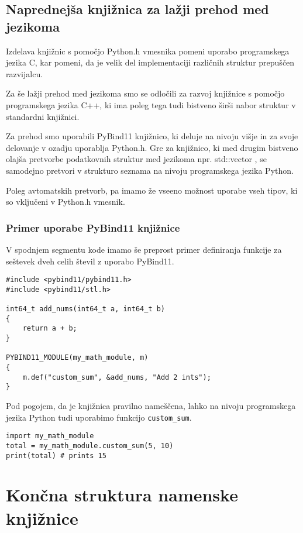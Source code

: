 \documentclass[a4paper,12pt,openright]{book}
\begin{document}
    \subsection{Naprednejša knjižnica za lažji prehod med jezikoma}

    Izdelava knjižnic s pomočjo Python.h vmesnika pomeni uporabo programskega jezika C, kar pomeni, da je velik del implementaciji različnih struktur prepuščen razvijalcu.
    
    Za še lažji prehod med jezikoma smo se odločili za razvoj knjižnice s pomočjo programskega jezika C++, ki ima poleg tega tudi bistveno širši nabor struktur v standardni knjižnici. 

    Za prehod smo uporabili PyBind11 \cite{PYBIND11_GITHUB} knjižnico, ki deluje na nivoju višje in za svoje delovanje v ozadju uporablja Python.h. Gre za knjižnico, ki med drugim bistveno olajša pretvorbe podatkovnih struktur med jezikoma npr. std::vector \cite{CPP_VECTOR}, se samodejno pretvori v strukturo seznama na nivoju programskega jezika Python.

    Poleg avtomatskih pretvorb, pa imamo že vseeno možnost uporabe vseh tipov, ki so vključeni v Python.h vmesnik.

    \subsubsection{Primer uporabe PyBind11 knjižnice}
    V spodnjem segmentu kode imamo še preprost primer definiranja funkcije za seštevek dveh celih števil z uporabo PyBind11.
\begin{verbatim}
#include <pybind11/pybind11.h>
#include <pybind11/stl.h>

int64_t add_nums(int64_t a, int64_t b)
{
    return a + b;
}

PYBIND11_MODULE(my_math_module, m)
{
    m.def("custom_sum", &add_nums, "Add 2 ints");
}
\end{verbatim}

    \noindent
    Pod pogojem, da je knjižnica pravilno nameščena, lahko na nivoju programskega jezika Python tudi uporabimo funkcijo {\tt custom\_sum}.
\begin{verbatim}
import my_math_module
total = my_math_module.custom_sum(5, 10)
print(total) # prints 15
\end{verbatim}

    \newpage
    \section{Končna struktura namenske knjižnice}
\end{document}
